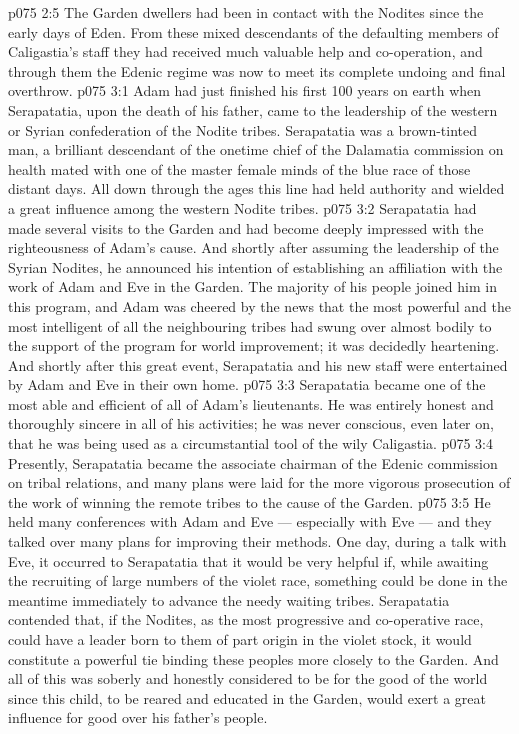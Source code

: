 \vs p075 2:5 The Garden dwellers had been in contact with the Nodites since the early days of Eden. From these mixed descendants of the defaulting members of Caligastia’s staff they had received much valuable help and co\hyp{}operation, and through them the Edenic regime was now to meet its complete undoing and final overthrow.
\vs p075 3:1 Adam had just finished his first 100 years on earth when Serapatatia, upon the death of his father, came to the leadership of the western or Syrian confederation of the Nodite tribes. Serapatatia was a brown\hyp{}tinted man, a brilliant descendant of the onetime chief of the Dalamatia commission on health mated with one of the master female minds of the blue race of those distant days. All down through the ages this line had held authority and wielded a great influence among the western Nodite tribes.
\vs p075 3:2 Serapatatia had made several visits to the Garden and had become deeply impressed with the righteousness of Adam’s cause. And shortly after assuming the leadership of the Syrian Nodites, he announced his intention of establishing an affiliation with the work of Adam and Eve in the Garden. The majority of his people joined him in this program, and Adam was cheered by the news that the most powerful and the most intelligent of all the neighbouring tribes had swung over almost bodily to the support of the program for world improvement; it was decidedly heartening. And shortly after this great event, Serapatatia and his new staff were entertained by Adam and Eve in their own home.
\vs p075 3:3 \pc Serapatatia became one of the most able and efficient of all of Adam’s lieutenants. He was entirely honest and thoroughly sincere in all of his activities; he was never conscious, even later on, that he was being used as a circumstantial tool of the wily Caligastia.
\vs p075 3:4 \pc Presently, Serapatatia became the associate chairman of the Edenic commission on tribal relations, and many plans were laid for the more vigorous prosecution of the work of winning the remote tribes to the cause of the Garden.
\vs p075 3:5 He held many conferences with Adam and Eve --- especially with Eve --- and they talked over many plans for improving their methods. One day, during a talk with Eve, it occurred to Serapatatia that it would be very helpful if, while awaiting the recruiting of large numbers of the violet race, something could be done in the meantime immediately to advance the needy waiting tribes. Serapatatia contended that, if the Nodites, as the most progressive and co\hyp{}operative race, could have a leader born to them of part origin in the violet stock, it would constitute a powerful tie binding these peoples more closely to the Garden. And all of this was soberly and honestly considered to be for the good of the world since this child, to be reared and educated in the Garden, would exert a great influence for good over his father’s people.
